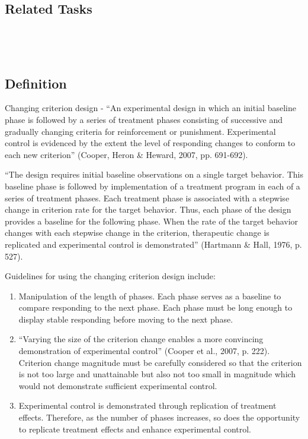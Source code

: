 \subsection{Related Tasks} 
\fourbThree{}\\ 
\fourjNine{}\\
%
%
%
%
%
%
%
\section{\fourbSix{}}
\subsection{Definition} 
Changing criterion design - ``An experimental design in which an initial baseline phase is followed by a series of treatment phases consisting of successive and gradually changing criteria for reinforcement or punishment. Experimental control is evidenced by the extent the level of responding changes to conform to each new criterion'' (Cooper, Heron \& Heward, 2007, pp. 691-692).

``The design requires initial baseline observations on a single target behavior. This baseline phase is followed by implementation of a treatment program in each of a series of treatment phases. Each treatment phase is associated with a stepwise change in criterion rate for the target behavior. Thus, each phase of the design provides a baseline for the following phase. When the rate of the target behavior changes with each stepwise change in the criterion, therapeutic change is replicated and experimental control is demonstrated'' (Hartmann \& Hall, 1976, p. 527).

Guidelines for using the changing criterion design include:
\begin{enumerate}
\item Manipulation of the length of phases. Each phase serves as a baseline to compare responding to the next phase. Each phase must be long enough to display stable responding before moving to the next phase.
\item ``Varying the size of the criterion change enables a more convincing demonstration of experimental control'' (Cooper et al., 2007, p. 222). Criterion change magnitude must be carefully considered so that the criterion is not too large and unattainable but also not too small in magnitude which would not demonstrate sufficient experimental control.
\item Experimental control is demonstrated through replication of treatment effects. Therefore, as the number of phases increases, so does the opportunity to replicate treatment effects and enhance experimental control.
\end{enumerate}
%
